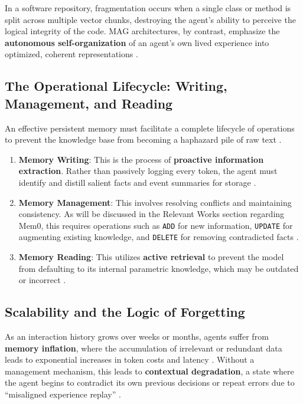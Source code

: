 \documentclass[conference]{IEEEtran}
\begin{document}
In a software repository, fragmentation occurs when a single class or method is split across multiple vector chunks, destroying the agent's ability to perceive the logical integrity of the code. MAG architectures, by contrast, emphasize the \textbf{autonomous self-organization} of an agent's own lived experience into optimized, coherent representations \cite{Nan2025Nemori:} \cite{Salama2025MemInsight}.

\subsection{The Operational Lifecycle: Writing, Management, and Reading}
An effective persistent memory must facilitate a complete lifecycle of operations to prevent the knowledge base from becoming a haphazard pile of raw text \cite{Zhang2024A} \cite{Chhikara2025Mem0:}.
\begin{enumerate}
    \item \textbf{Memory Writing}: This is the process of \textbf{proactive information extraction}. Rather than passively logging every token, the agent must identify and distill salient facts and event summaries for storage \cite{Chhikara2025Mem0:}.
    \item \textbf{Memory Management}: This involves resolving conflicts and maintaining consistency. As will be discussed in the Relevant Works section regarding Mem0, this requires operations such as \texttt{ADD} for new information, \texttt{UPDATE} for augmenting existing knowledge, and \texttt{DELETE} for removing contradicted facts \cite{Chhikara2025Mem0:}.
    \item \textbf{Memory Reading}: This utilizes \textbf{active retrieval} to prevent the model from defaulting to its internal parametric knowledge, which may be outdated or incorrect \cite{Wang2025MIRIX:}.
\end{enumerate}

\subsection{Scalability and the Logic of Forgetting}
As an interaction history grows over weeks or months, agents suffer from \textbf{memory inflation}, where the accumulation of irrelevant or redundant data leads to exponential increases in token costs and latency \cite{Xu2025Memory}. Without a management mechanism, this leads to \textbf{contextual degradation}, a state where the agent begins to contradict its own previous decisions or repeat errors due to ``misaligned experience replay'' \cite{Xu2025Memory}.
\end{document}

